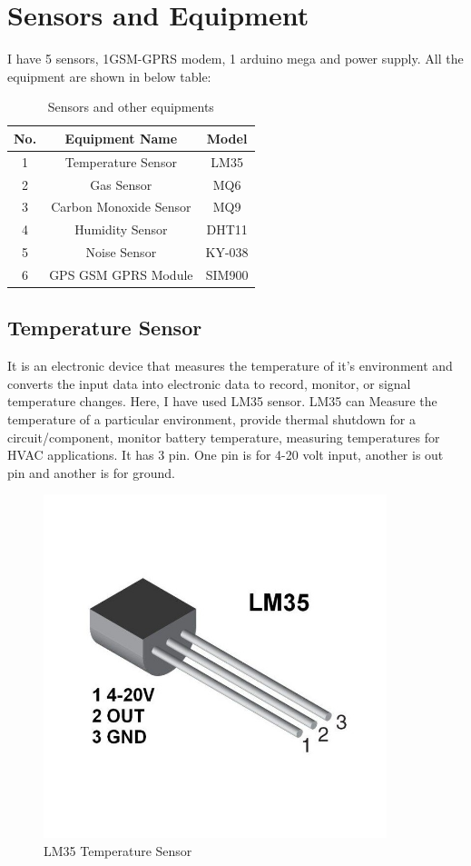 \chapter{Sensors and Equipment}
I have 5 sensors, 1GSM-GPRS modem, 1 arduino mega and power supply. All the equipment are shown in below table:\newline
\begin{table}[h!]
\begin{center}
\begin{tabular}{|c|c|c|}
  \hline
  No. & Equipment Name & Model \\
  \hline
  1 & Temperature Sensor & LM35  \\
  \hline
  2 & Gas Sensor & MQ6  \\
  \hline
  3 & Carbon Monoxide Sensor & MQ9  \\
  \hline
  4 & Humidity Sensor & DHT11  \\
  \hline
  5 & Noise Sensor & KY-038  \\
  \hline
  6 & GPS GSM GPRS Module & SIM900  \\
  \hline
\end{tabular}{}
\end{center}
\caption{Sensors and other equipments}
\label{table:}
\end{table}
\section{Temperature Sensor}
It is an electronic device that measures the temperature of it's environment and converts the input data into electronic data to record, monitor, or signal temperature changes. Here, I have used LM35 sensor. LM35 can Measure the temperature of a particular environment, provide thermal shutdown for a circuit/component, monitor battery temperature, measuring temperatures for HVAC applications. It has 3 pin. One pin is for 4-20 volt input, another is out pin and another is for ground. \cite{liu2011application}
\begin{figure} [h!]
\centering
 \includegraphics[width=10cm]{Results/lm35.jpg}
 \caption[]{LM35 Temperature Sensor}
    \label{}
\end{figure}
